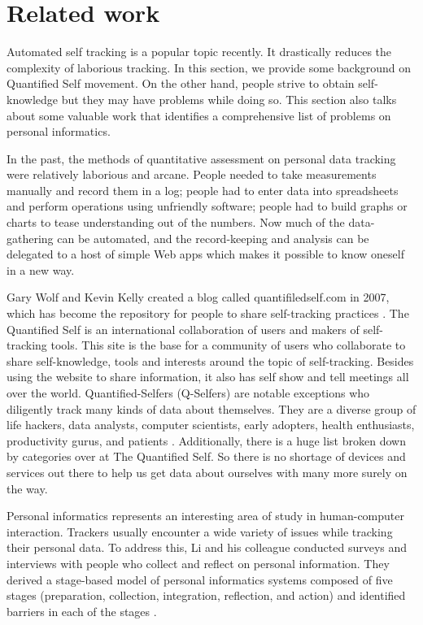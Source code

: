 \section{Related work}
Automated self tracking is a popular topic recently. It drastically reduces the complexity of laborious tracking. In this section, we provide some background on Quantified Self movement. On the other hand, people strive to obtain self-knowledge but they may have problems while doing so. This section also talks about some valuable work that identifies a comprehensive list of problems on personal informatics. 
 
In the past, the methods of quantitative assessment on personal data tracking were relatively laborious and arcane. People needed to take measurements manually and record them in a log; people had to enter data into spreadsheets and perform operations using unfriendly software; people had to build graphs or charts to tease understanding out of the numbers. Now much of the data-gathering can be automated, and the record-keeping and analysis can be delegated to a host of simple Web apps which makes it possible to know oneself in a new way. 

Gary Wolf and Kevin Kelly created a blog called quantifiledself.com in 2007, which has become the repository for people to share self-tracking practices \cite{choe2014understanding}. The Quantified Self is an international collaboration of users and makers of self-tracking tools. This site is the base for a community of users who collaborate to share self-knowledge, tools and interests around the topic of self-tracking. Besides using the website to share information, it also has self show and tell meetings all over the world. Quantified-Selfers (Q-Selfers) are notable exceptions who diligently track many kinds of data about themselves. They are a diverse group of life hackers, data analysts, computer scientists, early adopters, health enthusiasts, productivity gurus, and patients \cite{choe2014understanding}. Additionally, there is a huge list broken down by categories over at The Quantified Self. So there is no shortage of devices and services out there to help us get data about ourselves with many more surely on the way. 

Personal informatics represents an interesting area of study in human-computer interaction. Trackers usually encounter a wide variety of issues while tracking their personal data. To address this, Li and his colleague conducted surveys and interviews with people who collect and reflect on personal information. They derived a stage-based model of personal informatics systems composed of five stages (preparation, collection, integration, reflection, and action) and identified barriers in each of the stages \cite{li2010stage}.

